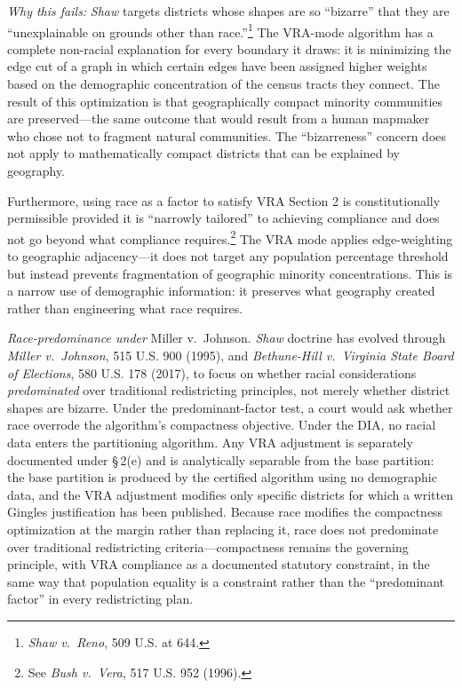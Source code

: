 \textit{Why this fails:} \textit{Shaw} targets districts whose shapes are so ``bizarre'' that they are ``unexplainable on grounds other than race.''\footnote{\textit{Shaw v.\ Reno}, 509 U.S. at 644.} The VRA-mode algorithm has a complete non-racial explanation for every boundary it draws: it is minimizing the edge cut of a graph in which certain edges have been assigned higher weights based on the demographic concentration of the census tracts they connect. The result of this optimization is that geographically compact minority communities are preserved---the same outcome that would result from a human mapmaker who chose not to fragment natural communities. The ``bizarreness'' concern does not apply to mathematically compact districts that can be explained by geography.

Furthermore, using race as a factor to satisfy VRA Section 2 is constitutionally permissible provided it is ``narrowly tailored'' to achieving compliance and does not go beyond what compliance requires.\footnote{See \textit{Bush v.\ Vera}, 517 U.S. 952 (1996).} The VRA mode applies edge-weighting to geographic adjacency---it does not target any population percentage threshold but instead prevents fragmentation of geographic minority concentrations. This is a narrow use of demographic information: it preserves what geography created rather than engineering what race requires.

\textit{Race-predominance under} Miller v.\ Johnson. \textit{Shaw} doctrine has evolved through \textit{Miller v.\ Johnson}, 515 U.S. 900 (1995), and \textit{Bethune-Hill v.\ Virginia State Board of Elections}, 580 U.S. 178 (2017), to focus on whether racial considerations \textit{predominated} over traditional redistricting principles, not merely whether district shapes are bizarre. Under the predominant-factor test, a court would ask whether race overrode the algorithm's compactness objective. Under the DIA, no racial data enters the partitioning algorithm. Any VRA adjustment is separately documented under \S\,2(e) and is analytically separable from the base partition: the base partition is produced by the certified algorithm using no demographic data, and the VRA adjustment modifies only specific districts for which a written Gingles justification has been published. Because race modifies the compactness optimization at the margin rather than replacing it, race does not predominate over traditional redistricting criteria---compactness remains the governing principle, with VRA compliance as a documented statutory constraint, in the same way that population equality is a constraint rather than the ``predominant factor'' in every redistricting plan.

